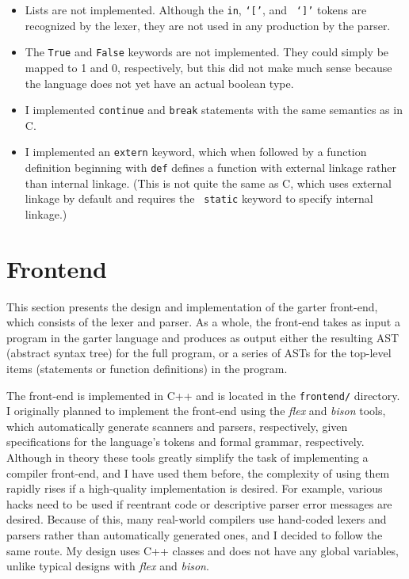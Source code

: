 \documentclass[11pt]{article}
\begin{document}
\begin{itemize}
    \item Lists are not implemented.  Although the {\tt in}, {\tt `['}, and {\tt
        `]'} tokens are recognized by the lexer, they are not used in any
        production by the parser.
    \item The {\tt True} and {\tt False} keywords are not implemented.  They
        could simply be mapped to 1 and 0, respectively, but this did not make
        much sense because the language does not yet have an actual boolean type.
    \item I implemented {\tt continue} and {\tt break} statements with the same
        semantics as in C.
    \item I implemented an {\tt extern} keyword, which when followed by a
        function definition beginning with {\tt def} defines a function with
        external linkage rather than internal linkage.  (This is not quite the
        same as C, which uses external linkage by default and requires the {\tt
        static} keyword to specify internal linkage.)
\end{itemize}

\section{Frontend}

This section presents the design and implementation of the garter front-end,
which consists of the lexer and parser.  As a whole, the front-end takes as input
a program in the garter language and produces as output either the resulting
AST (abstract syntax tree) for the full program, or a series of ASTs for the
top-level items (statements or function definitions) in the program.

The front-end is implemented in C++ and is located in the {\tt frontend/}
directory.  I originally planned to implement the front-end using the {\em flex}
and {\em bison} tools, which automatically generate scanners and parsers,
respectively, given specifications for the language's tokens and formal grammar,
respectively.  Although in theory these tools greatly simplify the task of
implementing a compiler front-end, and I have used them before, the complexity
of using them rapidly rises if a high-quality implementation is desired.  For
example, various hacks need to be used if reentrant code or descriptive parser
error messages are desired.  Because of this, many real-world compilers use
hand-coded lexers and parsers rather than automatically generated ones, and I
decided to follow the same route.  My design uses C++ classes and does not have
any global variables, unlike typical designs with {\em flex} and {\em bison}.
\end{document}
